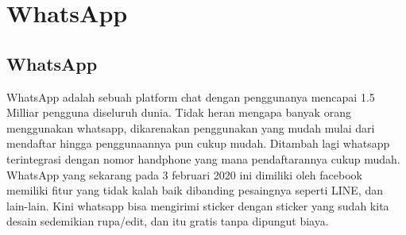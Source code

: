 \section{WhatsApp}

\subsection{WhatsApp}
WhatsApp adalah sebuah platform chat dengan penggunanya mencapai 1.5 Milliar pengguna diseluruh dunia. Tidak heran mengapa banyak orang menggunakan whatsapp, dikarenakan penggunakan yang mudah mulai dari mendaftar hingga penggunaannya pun cukup mudah. Ditambah lagi whatsapp terintegrasi dengan nomor handphone yang mana pendaftarannya cukup mudah. WhatsApp yang sekarang pada 3 februari 2020 ini dimiliki oleh facebook memiliki fitur yang tidak kalah baik dibanding pesaingnya seperti LINE, dan lain-lain. Kini whatsapp bisa mengirimi sticker dengan sticker yang sudah kita desain sedemikian rupa/edit, dan itu gratis tanpa dipungut biaya.